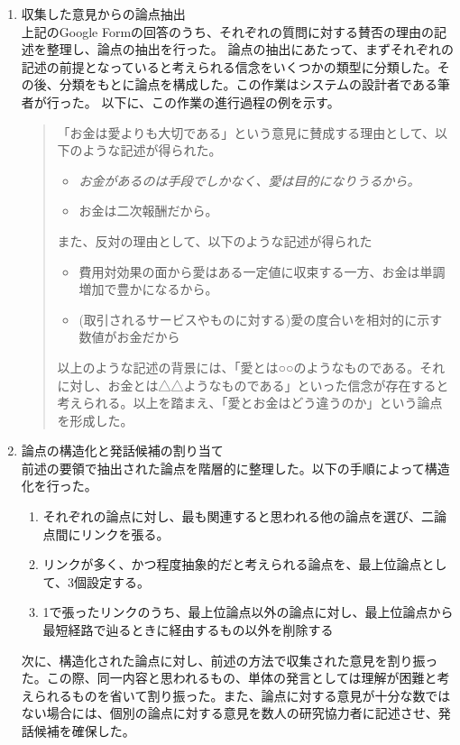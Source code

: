 \documentclass[11pt, a4paper]{jreport} %
\begin{document}
\begin{enumerate}
\item 収集した意見からの論点抽出\\
上記のGoogle Formの回答のうち、それぞれの質問に対する賛否の理由の記述を整理し、論点の抽出を行った。
論点の抽出にあたって、まずそれぞれの記述の前提となっていると考えられる信念をいくつかの類型に分類した。その後、分類をもとに論点を構成した。この作業はシステムの設計者である筆者が行った。
以下に、この作業の進行過程の例を示す。
\begin{quote}
「お金は愛よりも大切である」という意見に賛成する理由として、以下のような記述が得られた。
\begin{itemize}
\item \textsl{お金があるのは手段でしかなく、愛は目的になりうるから。}
\item お金は二次報酬だから。
\end{itemize}
また、反対の理由として、以下のような記述が得られた
\begin{itemize}
\item 費用対効果の面から愛はある一定値に収束する一方、お金は単調増加で豊かになるから。
\item (取引されるサービスやものに対する)愛の度合いを相対的に示す数値がお金だから
\end{itemize}


以上のような記述の背景には、「愛とは○○のようなものである。それに対し、お金とは△△ようなものである」といった信念が存在すると考えられる。以上を踏まえ、「愛とお金はどう違うのか」という論点を形成した。
\end{quote}

\item  論点の構造化と発話候補の割り当て\\
前述の要領で抽出された論点を階層的に整理した。以下の手順によって構造化を行った。
\begin{enumerate}
\renewcommand{\labelenumii}{(\arabic{enumii}).}
\item それぞれの論点に対し、最も関連すると思われる他の論点を選び、二論点間にリンクを張る。
\item リンクが多く、かつ程度抽象的だと考えられる論点を、最上位論点として、3個設定する。
\item 1で張ったリンクのうち、最上位論点以外の論点に対し、最上位論点から最短経路で辿るときに経由するもの以外を削除する
\end{enumerate}


次に、構造化された論点に対し、前述の方法で収集された意見を割り振った。この際、同一内容と思われるもの、単体の発言としては理解が困難と考えられるものを省いて割り振った。また、論点に対する意見が十分な数ではない場合には、個別の論点に対する意見を数人の研究協力者に記述させ、発話候補を確保した。


\end{enumerate}
\end{document}
